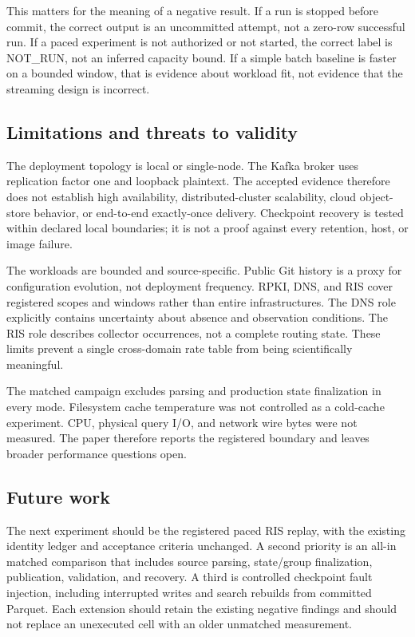 This matters for the meaning of a negative result. If a run is stopped before commit, the correct output is an uncommitted attempt, not a zero-row successful run. If a paced experiment is not authorized or not started, the correct label is NOT_RUN, not an inferred capacity bound. If a simple batch baseline is faster on a bounded window, that is evidence about workload fit, not evidence that the streaming design is incorrect.

\subsection{Limitations and threats to validity}
The deployment topology is local or single-node. The Kafka broker uses replication factor one and loopback plaintext. The accepted evidence therefore does not establish high availability, distributed-cluster scalability, cloud object-store behavior, or end-to-end exactly-once delivery. Checkpoint recovery is tested within declared local boundaries; it is not a proof against every retention, host, or image failure.

The workloads are bounded and source-specific. Public Git history is a proxy for configuration evolution, not deployment frequency. RPKI, DNS, and RIS cover registered scopes and windows rather than entire infrastructures. The DNS role explicitly contains uncertainty about absence and observation conditions. The RIS role describes collector occurrences, not a complete routing state. These limits prevent a single cross-domain rate table from being scientifically meaningful.

The matched campaign excludes parsing and production state finalization in every mode. Filesystem cache temperature was not controlled as a cold-cache experiment. CPU, physical query I/O, and network wire bytes were not measured. The paper therefore reports the registered boundary and leaves broader performance questions open.

\subsection{Future work}
The next experiment should be the registered paced RIS replay, with the existing identity ledger and acceptance criteria unchanged. A second priority is an all-in matched comparison that includes source parsing, state/group finalization, publication, validation, and recovery. A third is controlled checkpoint fault injection, including interrupted writes and search rebuilds from committed Parquet. Each extension should retain the existing negative findings and should not replace an unexecuted cell with an older unmatched measurement.

\nocite{*}


